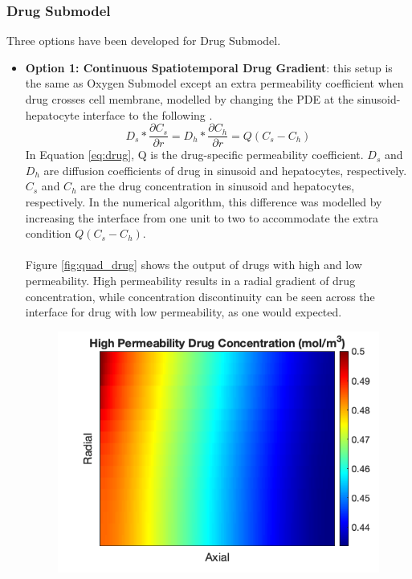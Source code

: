 \documentclass[12pt]{article}
\begin{document}
\subsubsection{Drug Submodel}
Three options have been developed for Drug Submodel.
\begin{itemize}
    \item \textbf{Option 1: Continuous Spatiotemporal Drug Gradient}: this setup is the same as Oxygen Submodel except an extra permeability coefficient when drug crosses cell membrane, modelled by changing the PDE at the sinusoid-hepatocyte interface to the following \cite{leedaleMultiscaleModellingDrug2020}.
    \begin{equation}
        D_s*\frac{\partial C_s}{\partial r}=D_h*\frac{\partial C_h}{\partial r}=Q(C_s-C_h)
        \label{eq:drug}
    \end{equation}
    In Equation \ref{eq:drug}, Q is the drug-specific permeability coefficient. $D_s$ and $D_h$ are diffusion coefficients of drug in sinusoid and hepatocytes, respectively. $C_s$ and $C_h$ are the drug concentration in sinusoid and hepatocytes, respectively. In the numerical algorithm, this difference was modelled by increasing the interface from one unit to two to accommodate the extra condition $Q(C_s-C_h)$.\\\\Figure \ref{fig:quad_drug} shows the output of drugs with high and low permeability. High permeability results in a radial gradient of drug concentration, while concentration discontinuity can be seen across the interface for drug with low permeability, as one would expected.
     \begin{figure}
 \begin{minipage}[b]{0.5\linewidth}
    \centering
    \includegraphics[width=\linewidth]{drug_high.png} 

\end{minipage}
\end{figure}
\end{itemize}
\end{document}
